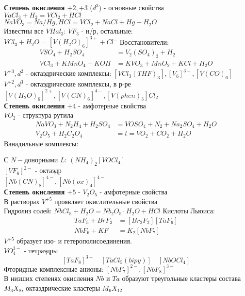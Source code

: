 \textbf{Степень окисления $+2, +3$} ($d^3$) - основные свойства \\
$VaCl_3  + H_2 = VCl_2 + HCl$ \\
$NaVO_3 = Na/Hg, HCl = VCl_2 + NaCl + Hg + H_2O$ \\
Известны все $VHal_3$: $VF_3$ - н/р, остальные: $VCl_3 + H_2O = \left[V(H_2O)_6 \right]^{3+} + Cl^-  $ 
Восстановители:
\begin{align*}
VSO_4 + H_2SO_4 &= V_2(SO_4)_3 + H_2 \\	
VCl_3 + KMnO_4 + KOH &= KVO_3 + MnO_2 + KCl + H_2O 
\end{align*}
$V^{+3}, d^2$ - октаэдрические комплексы: $ \left[VCl_3(THF)_3 \right], \left[V_6 \right]^{3-}, \left[V(CO)_6 \right] $ \\
$V^{+2}, d^3$ - октаэдрические комплексы, в р-ре $ \left[V(H_2O)_6 \right]^{2+}, \left[V(CN)_6 \right]^{4-}, \left[V(phen)_3 \right]Cl_2 $ \\
\textbf{Степень окисления $+4$} - амфотерные свойства \\
$VO_2$ - структура рутила
\begin{align*}
NaVO_3 + N_2H_4 + H_2SO_4 &= VOSO_4 + N_2 + Na_2SO_4 + H_2O \\
V_2O_5 + H_2C_2O_4 &= t = VO_2 + CO_2 + H_2O
\end{align*}
Ванадильные комплексы:
\begin{figure} [H]
	\centering {\texttt{[image: ee1]}}
\end{figure}
С $N-$донорными $L$: $(NH_4)_2\left[VOCl_4 \right]$ \\
$\left[VF_6 \right]^{2-}$ - октаэдр \\
$ 	\left[Nb(CN)_8 \right]^{4-}, \left[Nb(ox)_4 \right]^{4-} $ \\
\textbf{Степень окисления $+5$} - $V_2O_5$ - амфотерные свойства \\
В растворах $V^{+5}$ проявляет окислительные свойства \\
Гидролиз солей: $ NbCl_5 + H_2O = Nb_2O_5 \cdot H_2O + HCl $
Кислоты Льюиса: 
\begin{align*}
TaF_5 + BrF_3 &= \left[Br_2F_2 \right]\left[TaF_6 \right] \\
NbF_6 + KF &=   K_2\left[NbF_7 \right]
\end{align*}
$V^{+5}$ образует изо- и гетерополисоединения. \\
$VO_4^{3-}$ - тетраэдры \\
\[
\left[TaF_8 \right]^{3-} \quad \left[TaCl_5(bipy) \right] \quad \left[NbOCl_4 \right]
\] 
Фторидные комплексные анионы: $ \left[NbF_7 \right]^{2-}, \left[NbF_8 \right]^{3-} $ \\
В низших степенях окисления $Nb$ и $Ta$ образуют треугольные кластеры состава $M_3X_8$, октаэдрические кластеры $M_6X_{12}$

